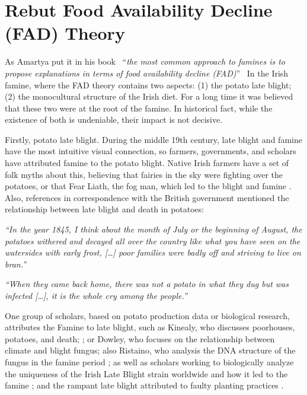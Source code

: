 \section{Rebut Food Availability Decline (FAD) Theory}

As Amartya put it in his book \textendash\ ``\textit{the most common approach to famines is to propose explanations in terms of food availability decline (FAD)}'' \citep{sen1982poverty} \textendash\ In the Irish famine, where the FAD theory contains two aspects: (1) the potato late blight; (2) the monocultural structure of the Irish diet. For a long time it was believed that these two were at the root of the famine. In historical fact, while the existence of both is undeniable, their impact is not decisive.

Firstly, potato late blight. During the middle 19th century, 
late blight and famine have the most intuitive visual connection, so farmers, governments, and scholars have attributed famine to the potato blight. Native Irish farmers have a set of folk myths about this, believing that fairies in the sky were fighting over the potatoes, or that Fear Liath, the fog man, which led to the blight and famine \citep{bartoletti2001black}. Also, references in correspondence with the British government mentioned the relationship between late blight and death in potatoes:

\textit{``In the year 1845, I think about the month of July or the beginning of August, the potatoes withered and decayed all over the country like what you have seen on
the watersides with early frost, [\ldots] poor families were badly off and striving to live on bran.''} \citep{mcclureletter1848}

\textit{``When they came back home, there was not a potato in what they dug but was infected [\ldots], it is the whole cry among the people.''} \citep{blackwellletter1845}

One group of scholars, based on potato production data or biological research, attributes the Famine to late blight, such as Kinealy, who discusses poorhouses, potatoes, and death; \citep{kinealy1990irish}; or Dowley, who focuses on the relationship between climate and blight fungus\citep{dowley1997potato}; also Ristaino, who analysis the DNA structure of the fungus in the famine period \citep{ristaino2006tracking}; as well as scholars working to biologically analyze the uniqueness of the Irish Late Blight strain worldwide and how it led to the famine \citep{goss2014irish}; and the rampant late blight attributed to faulty planting practices \citep{lidwell2020cultivating}.

